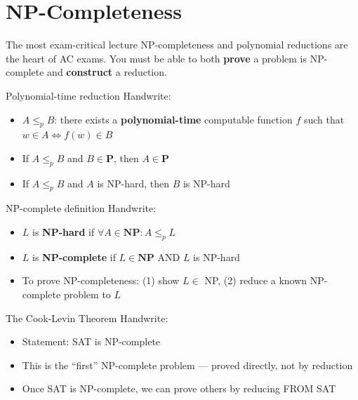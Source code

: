 \documentclass[11pt,a4paper]{article}
\begin{document}
\section{NP-Completeness}

\begin{dangerbox}{The most exam-critical lecture}
NP-completeness and polynomial reductions are the heart of AC exams. You must be able to both \textbf{prove} a problem is NP-complete and \textbf{construct} a reduction.
\end{dangerbox}

\begin{writebox}{Polynomial-time reduction}
Handwrite:
\begin{itemize}[nosep]
\item $A \leq_p B$: there exists a \textbf{polynomial-time} computable function $f$ such that $w \in A \iff f(w) \in B$
\item If $A \leq_p B$ and $B \in \textbf{P}$, then $A \in \textbf{P}$
\item If $A \leq_p B$ and $A$ is NP-hard, then $B$ is NP-hard
\end{itemize}
\end{writebox}

\begin{writebox}{NP-complete definition}
Handwrite:
\begin{itemize}[nosep]
\item $L$ is \textbf{NP-hard} if $\forall A \in \textbf{NP}: A \leq_p L$
\item $L$ is \textbf{NP-complete} if $L \in \textbf{NP}$ AND $L$ is NP-hard
\item To prove NP-completeness: (1) show $L \in$ NP, (2) reduce a known NP-complete problem to $L$
\end{itemize}
\end{writebox}

\begin{writebox}{The Cook-Levin Theorem}
Handwrite:
\begin{itemize}[nosep]
\item Statement: SAT is NP-complete
\item This is the ``first'' NP-complete problem --- proved directly, not by reduction
\item Once SAT is NP-complete, we can prove others by reducing FROM SAT
\end{itemize}
\end{writebox}
\end{document}
